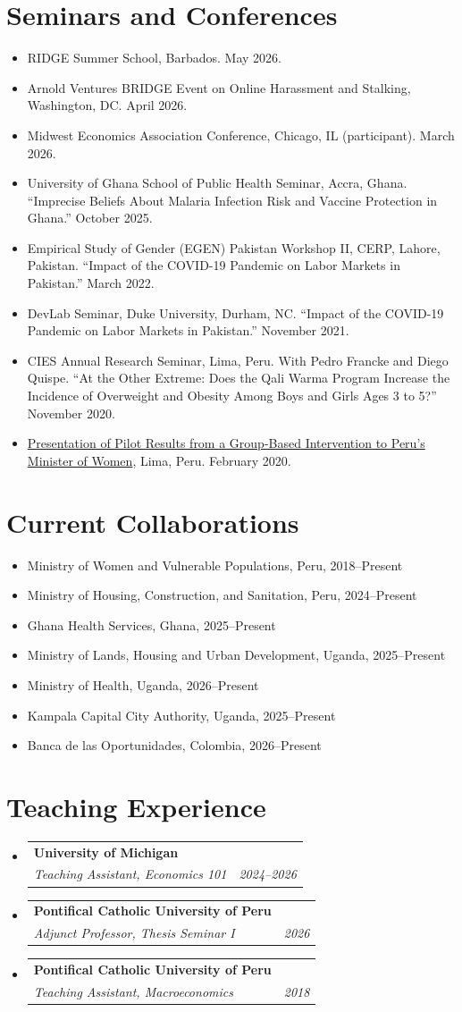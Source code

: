 \documentclass[letterpaper,10pt]{article}
\makeatletter
\newcommand{\resumeSubheading}[4]{
  \vspace{0pt}\item
    \begin{tabular*}{\textwidth}{l@{\extracolsep{\fill}}r}
      \textbf{#1} & #2 \\
      \textit{#3} & \textit{#4} \\
    \end{tabular*}\vspace{-4pt}
}
\newcommand{\resumeSubItem}[1]{
  \item {\small #1}
}
\newcommand{\resumeSubHeadingListStart}{\begin{itemize}[leftmargin=0pt,label={}]}
\newcommand{\resumeSubHeadingListEnd}{\end{itemize}\vspace{-2pt}}
\makeatother
\begin{document}
\section{Seminars and Conferences}
\resumeSubHeadingListStart
  \resumeSubItem{RIDGE Summer School, Barbados. May 2026.}
  \resumeSubItem{Arnold Ventures BRIDGE Event on Online Harassment and Stalking, Washington, DC. April 2026.}
  \resumeSubItem{Midwest Economics Association Conference, Chicago, IL (participant). March 2026.}
  \resumeSubItem{University of Ghana School of Public Health Seminar, Accra, Ghana. ``Imprecise Beliefs About Malaria Infection Risk and Vaccine Protection in Ghana.'' October 2025.}
  \resumeSubItem{Empirical Study of Gender (EGEN) Pakistan Workshop II, CERP, Lahore, Pakistan. ``Impact of the COVID-19 Pandemic on Labor Markets in Pakistan.'' March 2022.}
  \resumeSubItem{DevLab Seminar, Duke University, Durham, NC. ``Impact of the COVID-19 Pandemic on Labor Markets in Pakistan.'' November 2021.}
  \resumeSubItem{CIES Annual Research Seminar, Lima, Peru. With Pedro Francke and Diego Quispe. ``At the Other Extreme: Does the Qali Warma Program Increase the Incidence of Overweight and Obesity Among Boys and Girls Ages 3 to 5?'' November 2020.}
  \resumeSubItem{\href{https://www.poverty-action.org/event/ipa-peru-presents-results-gender-based-violence-study}{Presentation of Pilot Results from a Group-Based Intervention to Peru's Minister of Women}, Lima, Peru. February 2020.}
\resumeSubHeadingListEnd

\section{Current Collaborations}
\resumeSubHeadingListStart
  \resumeSubItem{Ministry of Women and Vulnerable Populations, Peru, 2018--Present}
  \resumeSubItem{Ministry of Housing, Construction, and Sanitation, Peru, 2024--Present}
  \resumeSubItem{Ghana Health Services, Ghana, 2025--Present}
  \resumeSubItem{Ministry of Lands, Housing and Urban Development, Uganda, 2025--Present}
  \resumeSubItem{Ministry of Health, Uganda, 2026--Present}
  \resumeSubItem{Kampala Capital City Authority, Uganda, 2025--Present}
  \resumeSubItem{Banca de las Oportunidades, Colombia, 2026--Present}
\resumeSubHeadingListEnd

\section{Teaching Experience}
\resumeSubHeadingListStart
  \resumeSubheading
    {University of Michigan}{}{Teaching Assistant, Economics 101}{2024--2026}
  \resumeSubheading
    {Pontifical Catholic University of Peru}{}{Adjunct Professor, Thesis Seminar I}{2026}
  \resumeSubheading
    {Pontifical Catholic University of Peru}{}{Teaching Assistant, Macroeconomics}{2018}
\resumeSubHeadingListEnd
\end{document}
